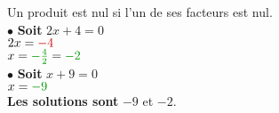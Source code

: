 \begin{pagesolutions}
\begin{tcolorbox}[cartesolution={20}]
        Un produit est nul si l'un de ses facteurs est nul.\\[0.3cm]
        $\bullet$ \textbf{Soit} $2x + 4 = 0$\\
        \phantom{$\bullet$ Soit} $2x = \modif{-4}$\\
        \phantom{$\bullet$ Soit} $x = \reduc{-\frac{4}{2}} = \reduc{-2}$\\[0.3cm]
        $\bullet$ \textbf{Soit} $x + 9 = 0$\\
        \phantom{$\bullet$ Soit} $x = \reduc{-9}$\\[0.5cm]
        \textbf{Les solutions sont} $-9$ et $-2$.
    \end{tcolorbox}
\end{pagesolutions}